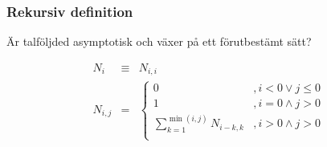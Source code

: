 \documentclass{beamer}
\begin{document}
\begin{frame}
	\frametitle{Rekursiv definition}
	Är talföljded asymptotisk och växer på ett förutbestämt sätt?
	
	\[
	\begin{array}{rcl}
	N_i & \equiv & N_{i,i} \\[5pt]
	N_{i,j} & = & \left\{
	\begin{array}{ll}
	0 & , i < 0 \vee j \leq 0\\[5pt]
	1 & ,i=0 \wedge j > 0\\[5pt]
	\displaystyle\sum_{k=1}^{\min(i,j)}N_{i-k,k} & ,i>0 \wedge j>0\\
	\end{array}
	\right.\\
	\end{array}
	\]
\end{frame}

\begin{frame}
	\frametitle{}
\end{frame}

\begin{frame}
	\frametitle{}
\end{frame}

\begin{frame}
	\frametitle{}
\end{frame}

\begin{frame}
	\frametitle{}
\end{frame}

\begin{frame}
	\frametitle{}
\end{frame}
\end{document}
